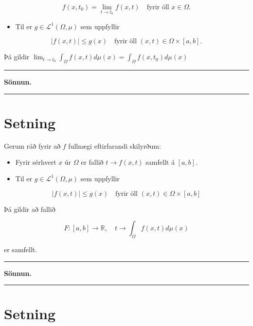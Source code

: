 \documentclass[]{book}
\providecommand{\tightlist}{%
  \setlength{\itemsep}{0pt}\setlength{\parskip}{0pt}}
\begin{document}
\[
f(x,t_0) = \lim_{t\rightarrow t_0}f(x,t) \quad \text{fyrir öll }x\in\Omega. 
\]

\begin{itemize}
\tightlist
\item
  Til er \(g\in\mathcal L^1(\Omega,\mu)\) sem uppfyllir
\end{itemize}

\[
|f(x,t)|\leq g(x) \quad \text{fyrir öll } (x,t)\in\Omega\times[a,b].
\]

Þá gildir \(\lim_{t\rightarrow t_0}\int_\Omega f(x,t)d\mu(x) = \int_\Omega f(x,t_0)d\mu(x)\)

\begin{center}\rule{0.5\linewidth}{\linethickness}\end{center}

\textbf{Sönnun.}

\begin{center}\rule{0.5\linewidth}{\linethickness}\end{center}

\hypertarget{setning-60}{%
\section{Setning}\label{setning-60}}

Gerum ráð fyrir að \(f\) fullnægi eftirfarandi skilyrðum:

\begin{itemize}
\item
  Fyrir sérhvert \(x\) úr \(\Omega\) er fallið \(t\rightarrow f(x,t)\) samfellt á \([a,b]\).
\item
  Til er \(g\in\mathcal L^1(\Omega,\mu)\) sem uppfyllir
\end{itemize}

\[
|f(x,t)|\leq g(x) \quad \text{fyrir öll } (x,t)\in\Omega\times[a,b]
\]

Þá gildir að fallið

\[
F:[a,b]\rightarrow\mathbb R,\quad t\rightarrow\int_\Omega f(x,t) d\mu(x)
\]

er samfellt.

\begin{center}\rule{0.5\linewidth}{\linethickness}\end{center}

\textbf{Sönnun.}

\begin{center}\rule{0.5\linewidth}{\linethickness}\end{center}

\hypertarget{setning-61}{%
\section{Setning}\label{setning-61}}
\end{document}
